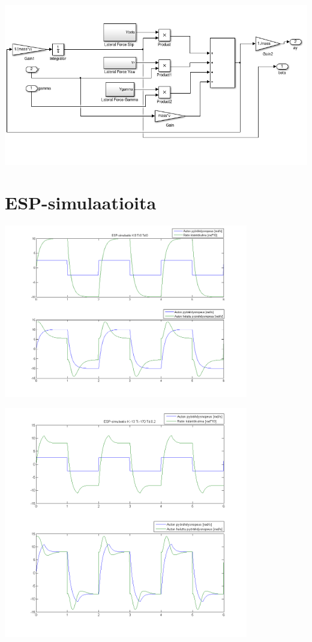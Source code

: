 \documentclass{article}
\newcommand{\kuvaa}[4]{%
	\begin{figure}[h]%
		\centering \texttt{[image: \#2]}%
		\caption{#3 \label{fig:#4}}%
	\end{figure}%
}
\begin{document}
\begin{appendices}
{ \includegraphics[width=1.0\textwidth]{espmdl2}}

\section{ESP-simulaatioita} \label{app:espsim}
{\centering \includegraphics[width=0.8\textwidth]{espSim1}

\includegraphics[width=0.8\textwidth]{espSim2}}
\end{appendices}
\end{document}
